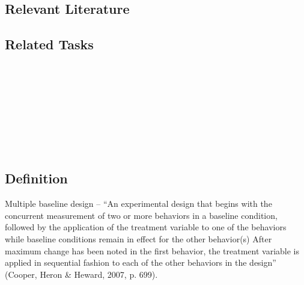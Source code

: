\subsection{Relevant Literature}
\begin{refsection}
\nocite{test,alang2017police,clayton2018black}
\printbibliography[heading=none]
\end{refsection}
%
\subsection{Related Tasks}
\fourbFour{}\\
\fourbFive{}\\
\fourbSeven{}\\
\fourbNine{}\\
\fourbEleven{}\\ 
\fourhFour{}\\
\fouriOne{}\\
%
%
%
%
%
%
%
%
\section{\fourbSeven{}}
\subsection{Definition}
Multiple baseline design – ``An experimental design that begins with the concurrent measurement of two or more behaviors in a baseline condition, followed by the application of the treatment variable to one of the behaviors while baseline conditions remain in effect for the other behavior(s) After maximum change has been noted in the first behavior, the treatment variable is applied in sequential fashion to each of the other behaviors in the design'' (Cooper, Heron \& Heward, 2007, p. 699).

